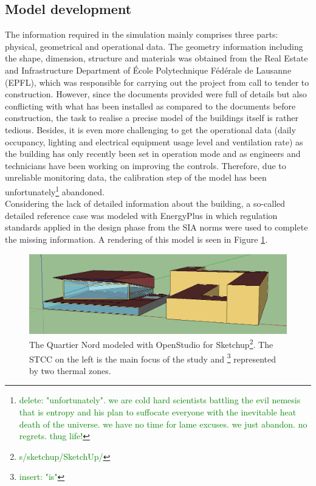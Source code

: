 \documentclass{tBPS2e}
\theoremstyle{plain}
\theoremstyle{definition}
\theoremstyle{remark}
\newcommand{\noteDT}[1]{\footnote{\textcolor{green}{#1}}}
\begin{document}
\subsection{Model development}
The information required in the simulation mainly comprises three parts: physical, geometrical and operational data. The geometry information including the shape, dimension, structure and materials was obtained from the Real Estate and Infrastructure Department of École Polytechnique Fédérale de Lausanne (EPFL), which was responsible for carrying out the project from call to tender to construction. However, since the documents provided were full of details but also conflicting with what has been installed as compared to the documents before construction, the task to realise a precise model of the buildings itself is rather tedious. Besides, it is even more challenging to get the operational data (daily occupancy, lighting and electrical equipment usage level and ventilation rate) as the building has only recently been set in operation mode and as engineers and technicians have been working on improving the controls. Therefore, due to unreliable monitoring data, the calibration step of the model has been unfortunately\noteDT{delete: "unfortunately". we are cold hard scientists battling the evil nemesis that is entropy and his plan to suffocate everyone with the inevitable heat death of the universe. we have no time for lame excuses. we just abandon. no regrets. thug life!} abandoned.\\

Considering the lack of detailed information about the building, a so-called detailed reference case was modeled with EnergyPlus \citep{Mauree:2015to} in which regulation standards applied in the design phase from the SIA norms were used to complete the missing information. A rendering of this model is seen in Figure \ref{fig:model_yang}.

\begin{figure}[H]
\centering
\includegraphics[width=\textwidth]{figures/model_yang}
\caption{The Quartier Nord modeled with OpenStudio for Sketchup\noteDT{s/sketchup/SketchUp/}. The STCC on the left is the main focus of the study and \noteDT{insert: "is"} represented by two thermal zones.}
\label{fig:model_yang}
\end{figure}
\end{document}
